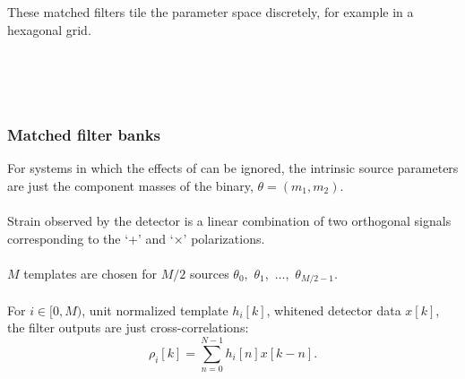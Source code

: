 \documentclass{beamer}
\begin{document}
\begin{frame}
\begin{columns}
\begin{column}{0.5\textwidth}
			These matched filters tile the parameter space discretely, for example in a hexagonal grid. \\~\\~\\~\\
		\end{column}
	\end{columns}
\end{frame}

\begin{frame}
	\frametitle{Matched filter banks}
	For systems in which the effects of can be ignored, the intrinsic source parameters are just the component masses of the binary, $\theta = (m_1, m_2)$. \\~\\

	Strain observed by the detector is a linear combination of two orthogonal signals corresponding to the `+' and `$\times$' polarizations. \\~\\

	$M$ templates are chosen for $M/2$ sources $\theta_0$,~$\theta_1$,~$\dots$,~$\theta_{M/2-1}$. \\~\\

	For $i \in [0, M)$, unit normalized template $h_i [k]$, whitened detector data $x[k]$, the filter outputs are just cross-correlations:
	$$
		\rho_i [k] = \sum_{n=0}^{N-1} h_{i}[n] x [k-n].
	$$
\end{frame}
\end{document}
